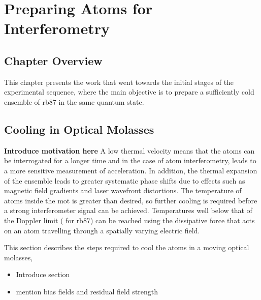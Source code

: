 \chapter{Preparing Atoms for Interferometry}\label{chap:atom_prep}
\section{Chapter Overview}
This chapter presents the work that went towards the initial stages of the experimental sequence, where the main objective is to prepare a sufficiently cold ensemble of \ac{rb87} in the same quantum state.


\section{Cooling in Optical Molasses}\label{sec:optical_molasses}
{\textbf{Introduce motivation here}}
A low thermal velocity means that the atoms can be interrogated for a longer time and in the case of atom interferometry, leads to a more sensitive measurement of acceleration. In addition, the thermal expansion of the ensemble leads to greater systematic phase shifts due to effects such as magnetic field gradients and laser wavefront distortions. The temperature of atoms inside the \ac{mot} is greater than desired, so further cooling is required before a strong interferometer signal can be achieved. Temperatures well below that of the Doppler limit ( for \ac{rb87}) can be reached using the dissipative force that acts on an atom travelling through a spatially varying electric field. 

\par\noindent
This section describes the steps required to cool the atoms in a moving optical molasses, 
\begin{itemize}
    \item Introduce section
    \item mention bias fields and residual field strength
\end{itemize}

